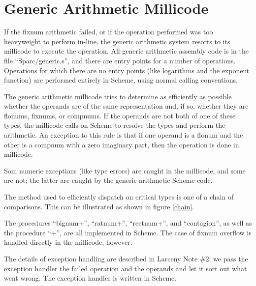 \section{Generic Arithmetic Millicode}

If the fixnum arithmetic failed, or if the operation performed was too
heavyweight to perform in-line, the generic arithmetic system resorts
to its millicode to execute the operation. All generic arithmetic
assembly code is in the file ``Sparc/generic.s'', and there are entry
points for a number of operations. Operations for which there are no
entry points (like logarithms and the exponent function) are
performed entirely in Scheme, using normal calling conventions.

The generic arithmetic millicode tries to determine as efficiently as
possible whether the operands are of the same representation and, if so,
whether they are flonums, fixnums, or compnums. If the operands are
not both of one of these types, the millicode calls on Scheme to resolve
the types and perform the arithmetic. An exception to this rule is that if one operand is a flonum
and the other is a compnum with a zero imaginary part, then the
operation is done in millicode.

Som numeric exceptions (like type errors) are caught in the millicode, and
some are not; the latter are caught by the generic arithmetic Scheme
code.

The method used to efficiently dispatch on critical types is one of a chain
of comparisons. This can be illustrated as shown in figure \ref{chain}.

The procedures ``bignum+'', ``ratnum+'', ``rectnum+'', and
``contagion'', as well as the procedure ``+'', are all implemented in
Scheme. The case of fixnum overflow is handled directly in the
millicode, however.

The details of exception handling are described in Larceny Note \#2;
we pass the exception handler the failed operation and the operands and
let it sort out what went wrong. The exception handler is written in
Scheme.

